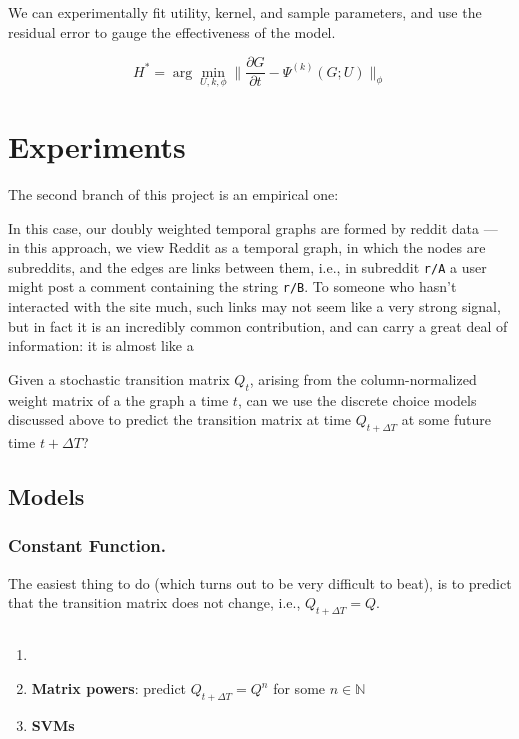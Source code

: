 \documentclass{article}
\theoremstyle{definition}
\begin{document}
	We can experimentally fit utility, kernel, and sample parameters, and use the residual error to gauge the effectiveness of the model.
	
	\[ H^* = \arg\min_{U,k,\phi} \Big\lVert \frac{\partial G}{\partial t} - \Psi^{(k)}(G;U)  \Big\rVert_\phi \]
	
	\section{Experiments}
	The second branch of this project is an empirical one:
	
	In this case, our doubly weighted temporal graphs are formed by reddit data --- in this approach, we view Reddit as a temporal graph, in which the nodes are subreddits, and the edges are links between them, i.e., in subreddit \texttt{r/A} a user might post a comment containing the string \texttt{r/B}. To someone who hasn't interacted with the site much, such links may  not seem like a very strong signal, but in fact it is an incredibly common contribution, and can carry a great deal of information: it is almost like a 
	
	Given a stochastic transition matrix $Q_t$, arising from the column-normalized weight matrix of a the graph a time $t$, can we use the discrete choice models discussed above to predict the transition matrix at time $Q_{t + \Delta T}$ at some future time $t + \Delta T$? 
	
	\subsection{Models}
	\subsubsection{Constant Function.} The easiest thing to do (which turns out to be very difficult to beat), is to predict that the transition matrix does not change, i.e., $Q_{t+\Delta T} = Q$.


	\subsection{}
	
	\begin{enumerate}
		\item 
		\item \textbf{Matrix powers}: predict $Q_{t+\Delta T} = Q^{n}$ for some $n \in \mathbb N$
		\item \textbf{SVMs}
	\end{enumerate}	
	
\end{document}
